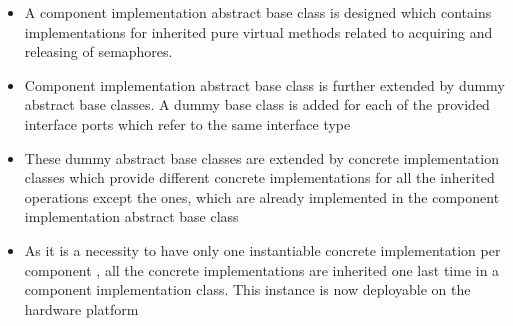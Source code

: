 \begin{itemize}
\item A component implementation abstract base class is designed which contains implementations for inherited pure virtual methods related to acquiring and releasing of semaphores.
\item Component implementation abstract base class is further extended by dummy abstract base classes. A dummy base class is added for each of the provided interface ports which refer to the same interface type
\item These dummy abstract base classes are extended by concrete implementation classes which provide different concrete implementations for all the inherited operations except the ones, which are already implemented in the component implementation abstract base class
\item As it is a necessity to have only one instantiable concrete implementation per component \cite{EvoRAVCodeAr,SpecMetamodel,CompBasedProcess}, all the concrete implementations are inherited one last time in a component implementation class. This instance is now deployable on the hardware platform
\end{itemize}
 
